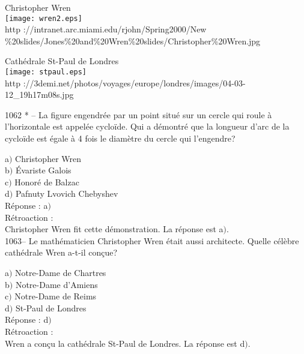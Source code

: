 ﻿\documentclass[letterpaper, 12pt]{article}
\begin{document}
        \begin{center}
        Christopher Wren\\
    \texttt{[image: wren2.eps]}\\
        {\footnotesize http ://intranet.arc.miami.edu/rjohn/Spring2000/New\\
        \%20slides/Jones\%20and\%20Wren\%20slides/Christopher\%20Wren.jpg}
    \end{center}

        \begin{center}
        Cath\'edrale St-Paul de Londres\\
    \texttt{[image: stpaul.eps]}\\
        {\footnotesize http
://3demi.net/photos/voyages/europe/londres/images/04-03-12\_19h17m08s.jpg}
    \end{center}

1062 * -- La figure engendr\'ee par un point situ\'e sur un cercle
qui roule \`a l'horizontale est appel\'ee cyclo\"ide. Qui a
d\'emontr\'e que la longueur d'arc de la cyclo\"ide est \'egale \`a
4 fois le diam\`etre du cercle qui l'engendre?

a$)$ Christopher Wren\\
b$)$ \'Evariste Galois \\
c$)$ Honor\'e de Balzac \\
d$)$ Pafnuty Lvovich Chebyshev\\

R\'eponse : a$)$\\

R\'etroaction : \\
Christopher Wren fit cette d\'emonstration.
La r\'eponse est a$)$.\\

1063-- Le math\'ematicien Christopher Wren \'etait aussi architecte.
Quelle c\'el\`ebre cath\'edrale Wren a-t-il con\c cue?

a$)$ Notre-Dame de Chartres  \\
b$)$ Notre-Dame d'Amiens \\
c$)$ Notre-Dame de Reims \\
d$)$ St-Paul de Londres \\

R\'eponse : d$)$\\

R\'etroaction : \\
Wren a con\c cu la cath\'edrale St-Paul de Londres.
La r\'eponse est d$)$.\\
\end{document}

